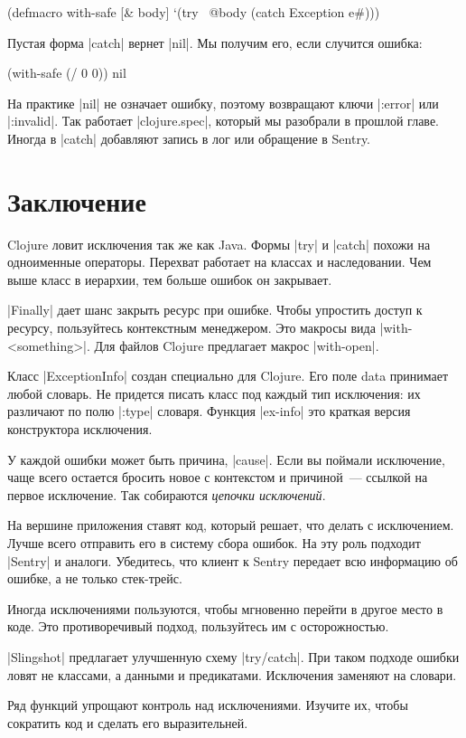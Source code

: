 \begin{english}
  \begin{clojure}
(defmacro with-safe [& body]
  `(try
     ~@body
     (catch Exception e#)))
  \end{clojure}
\end{english}

Пустая форма \spverb|catch| вернет \spverb|nil|. Мы получим его, если случится
ошибка:

\begin{english}
  \begin{clojure}
(with-safe (/ 0 0))
nil
  \end{clojure}
\end{english}

На практике \spverb|nil| не означает ошибку, поэтому возвращают ключи
\spverb|:error| или \spverb|:invalid|. Так работает \spverb|clojure.spec|,
который мы разобрали в прошлой главе. Иногда в \spverb|catch| добавляют запись в
лог или обращение в Sentry.

\section{Заключение}

Clojure ловит исключения так же как Java. Формы \spverb|try| и \spverb|catch|
похожи на одноименные операторы. Перехват работает на классах и
наследовании. Чем выше класс в иерархии, тем больше ошибок он закрывает.

\spverb|Finally| дает шанс закрыть ресурс при ошибке. Чтобы упростить доступ к
ресурсу, пользуйтесь контекстным менеджером. Это макросы вида
\spverb|with-<something>|. Для файлов Clojure предлагает макрос
\spverb|with-open|.

Класс \spverb|ExceptionInfo| создан специально для Clojure. Его поле data
принимает любой словарь. Не придется писать класс под каждый тип исключения: их
различают по полю \spverb|:type| словаря. Функция \spverb|ex-info| это краткая
версия конструктора исключения.

У каждой ошибки может быть причина, \spverb|cause|. Если вы поймали исключение,
чаще всего остается бросить новое с контекстом и причиной~--- ссылкой на первое
исключение. Так собираются \emph{цепочки исключений}.

На вершине приложения ставят код, который решает, что делать с
исключением. Лучше всего отправить его в систему сбора ошибок. На эту роль
подходит \spverb|Sentry| и аналоги. Убедитесь, что клиент к Sentry передает всю
информацию об ошибке, а не только стек-трейс.

Иногда исключениями пользуются, чтобы мгновенно перейти в другое место в
коде. Это противоречивый подход, пользуйтесь им с осторожностью.

\spverb|Slingshot| предлагает улучшенную схему \spverb|try/catch|. При таком
подходе ошибки ловят не классами, а данными и предикатами. Исключения заменяют
на словари.

Ряд функций упрощают контроль над исключениями. Изучите их, чтобы сократить код
и сделать его выразительней.
